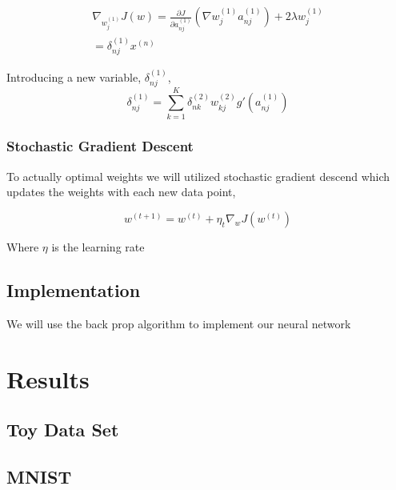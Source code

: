 \documentclass[12pt, twocolumn]{article}
\begin{document}
\begin{align}
\nabla_{w_j^{(1)}} J (w)= \frac{\partial J}{\partial a^{(1)}_{nj}}  (\nabla w_j^{(1)} a_{nj}^{(1)}) + 2 \lambda w_j^{(1)}  \\
 = \delta_{nj}^{(1)}  x^{(n)}
\end{align}


Introducing a new variable, $\delta_{nj}^{(1)}$, 
\begin{equation}
\delta_{nj}^{(1)} = \sum_{k=1}^K    \delta_{nk}^{(2)} w_{kj}^{(2)} g'(a_{nj}^{(1)})
\end{equation}

\subsubsection{Stochastic Gradient Descent}
To actually  optimal weights we will utilized stochastic gradient descend which updates the weights with each new data point,

\begin{equation}
w^{(t+1)} = w^{(t)} + \eta_t \nabla_w J(w^{(t)})
\end{equation}

Where $\eta$ is the learning rate
\subsection{Implementation}
We will use the back prop algorithm to implement our neural network 

\section{Results}
\subsection{ Toy Data Set}
\subsection{MNIST}


 
\end{document}
